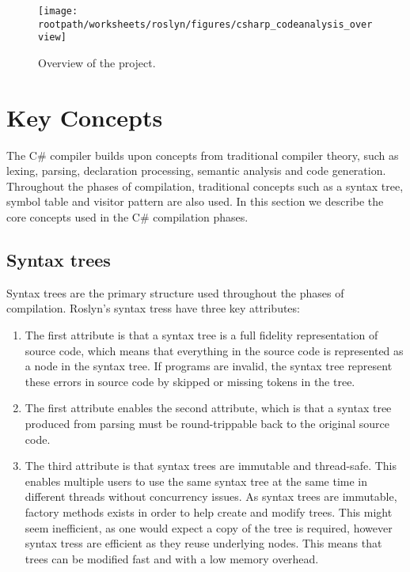 \begin{figure}[htbp]
\centering
 \texttt{[image: \\rootpath/worksheets/roslyn/figures/csharp\_codeanalysis\_overview]} 
 \caption{Overview of the  project.}
\label{fig:roslyn_csharpanalysis_overview}
\end{figure}

\section{Key Concepts}
The C\# compiler builds upon concepts from traditional compiler theory, such as lexing, parsing, declaration processing, semantic analysis and code generation\cite{sebestaProLang}\cite{fischer2009crafting}. Throughout the phases of compilation, traditional concepts such as a syntax tree, symbol table and visitor pattern are also used. In this section we describe the core concepts used in the C\# compilation phases.

\subsection{Syntax trees}
Syntax trees are the primary structure used throughout the phases of compilation. Roslyn's syntax tress have three key attributes\cite[p. 6]{ng2012roslyn}: 
\begin{enumerate}
	\item The first attribute is that a syntax tree is a full fidelity representation of source code, which means that everything in the source code is represented as a node in the syntax tree. If programs are invalid, the syntax tree represent these errors in source code by skipped or missing tokens in the tree. 
	\item The first attribute enables the second attribute, which is that a syntax tree produced from parsing must be round-trippable back to the original source code.
	\item The third attribute is that syntax trees are immutable and thread-safe. This enables multiple users to use the same syntax tree at the same time in different threads without concurrency issues. As syntax trees are immutable, factory methods exists in order to help create and modify trees. This might seem inefficient, as one would expect a copy of the tree is required, however syntax tress are efficient as they reuse underlying nodes. This means that trees can be modified fast and with a low memory overhead.
\end{enumerate}

